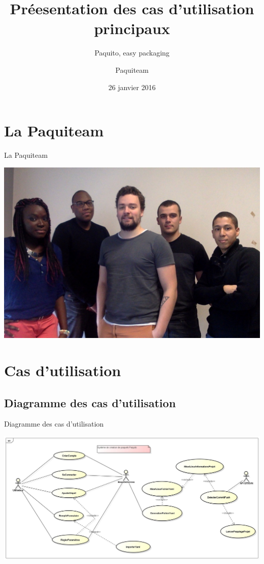 \documentclass[11pt,xcolor=dvipsnames]{beamer}
\author{Paquiteam}
\title{Préesentation des cas d'utilisation principaux}
\subtitle{Paquito, easy packaging}
\date{26 janvier 2016}
\begin{document}
\begin{frame}
\titlepage
\end{frame}

\section*{La Paquiteam}
\begin{frame}{La Paquiteam}
	\begin{center}
		\includegraphics[scale=0.26]{../img/paquiteam.jpg}
	\end{center}
\end{frame}


\begin{frame}
\tableofcontents
\end{frame}

\newcommand\largeur{0.15}

\section{Cas d'utilisation}
\subsection{Diagramme des cas d'utilisation}
\begin{frame}{Diagramme des cas d'utilisation}
	\begin{center}	
		\includegraphics[scale=\largeur]{../img/Diagram1.jpg}
	\end{center}
\end{frame}
\end{document}
